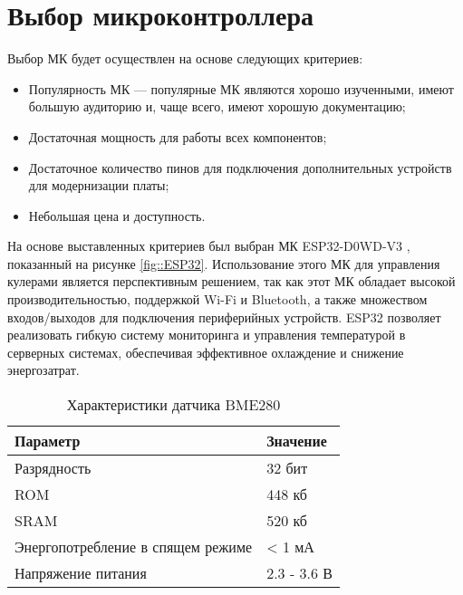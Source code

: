 \section {Выбор микроконтроллера}

Выбор МК будет осуществлен на основе следующих критериев:

\begin{itemize}

	\item Популярность МК --- популярные МК являются хорошо изученными, имеют большую аудиторию и, чаще всего, имеют хорошую документацию;
	
	\item Достаточная мощность для работы всех компонентов;
	
	\item Достаточное количество пинов для подключения дополнительных устройств для модернизации платы;

	\item Небольшая цена и доступность.
	
\end{itemize}

На основе выставленных критериев был выбран МК ESP32-D0WD-V3 \cite{datasheet::ESP32}, показанный на рисунке \ref{fig::ESP32}. Использование этого МК для управления кулерами является перспективным решением, так как этот МК обладает высокой производительностью, поддержкой Wi-Fi и Bluetooth, а также множеством входов/выходов для подключения периферийных устройств. ESP32 позволяет реализовать гибкую систему мониторинга и управления температурой в серверных системах, обеспечивая эффективное охлаждение и снижение энергозатрат.


\begin{table}[h!]
	\centering
	\caption{Характеристики датчика BME280}
	\begin{tabular}{| m{9cm} | m{6cm} |}
		\hline
		Параметр & Значение \\ \hline
		Разрядность & 32 бит \\ \hline
		ROM & 448 кб \\ \hline
		SRAM & 520 кб \\ \hline
		Энергопотребление в спящем режиме & < 1 мА\\ \hline
		Напряжение питания & 2.3 - 3.6 В \\ \hline
	\end{tabular}
	\label{tab::TempSensorCharacteristics}
\end{table}